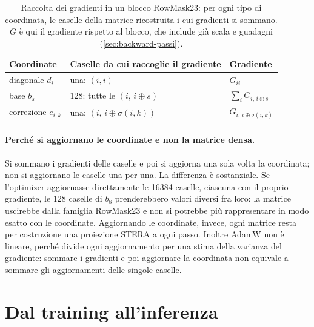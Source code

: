 \begin{table}[H]
\centering
\small
\renewcommand{\arraystretch}{1.25}
\begin{tabular}{lll}
\toprule
Coordinate & Caselle da cui raccoglie il gradiente & Gradiente \\
\midrule
\rowcolor{steraBlu!12} diagonale $d_i$ & una: $(i,i)$ & $G_{ii}$ \\
\rowcolor{steraGrigio!12} base $b_s$ & 128: tutte le $(i,\,i\oplus s)$ & $\sum_i G_{i,\,i\oplus s}$ \\
\rowcolor{steraArancio!15} correzione $e_{i,k}$ & una: $(i,\,i\oplus\sigma(i,k))$ & $G_{i,\,i\oplus\sigma(i,k)}$ \\
\bottomrule
\end{tabular}
\caption{Raccolta dei gradienti in un blocco RowMask23: per ogni tipo di coordinata, le caselle della matrice ricostruita i cui gradienti si sommano. $G$ è qui il gradiente rispetto al blocco, che include già scala e guadagni (\autoref{sec:backward-passi}).}
\label{tab:raccolta-gradienti}
\end{table}

\paragraph{Perché si aggiornano le coordinate e non la matrice densa.} Si sommano i gradienti delle caselle e poi si aggiorna una sola volta la coordinata; non si aggiornano le caselle una per una. La differenza è sostanziale. Se l'optimizer aggiornasse direttamente le \num{16384} caselle, ciascuna con il proprio gradiente, le 128 caselle di $b_8$ prenderebbero valori diversi fra loro: la matrice uscirebbe dalla famiglia RowMask23 e non si potrebbe più rappresentare in modo esatto con le coordinate. Aggiornando le coordinate, invece, ogni matrice resta per costruzione una proiezione STERA a ogni passo. Inoltre AdamW non è lineare, perché divide ogni aggiornamento per una stima della varianza del gradiente: sommare i gradienti e poi aggiornare la coordinata non equivale a sommare gli aggiornamenti delle singole caselle.


\section{Dal training all'inferenza}
\label{sec:guida-inferenza-stera}

